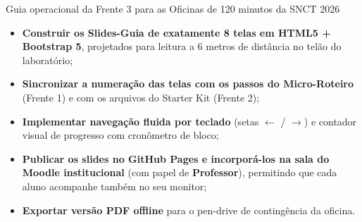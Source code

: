   {Guia operacional da Frente 3 para as Oficinas de 120 minutos da SNCT 2026}
  {\hspace{4pt}
   \hspace{4pt}
   }

\vspace{0.4em}

\begin{boxObjetivos}
\begin{itemize}
  \item \textbf{Construir os Slides-Guia de exatamente 8 telas em HTML5 + Bootstrap 5}, projetados para leitura a 6 metros de distância no telão do laboratório;
  \item \textbf{Sincronizar a numeração das telas com os passos do Micro-Roteiro} (Frente 1) e com os arquivos do Starter Kit (Frente 2);
  \item \textbf{Implementar navegação fluida por teclado} (setas $\leftarrow$ / $\rightarrow$) e contador visual de progresso com cronômetro de bloco;
  \item \textbf{Publicar os slides no GitHub Pages e incorporá-los na sala do Moodle institucional} (com papel de \textbf{Professor}), permitindo que cada aluno acompanhe também no seu monitor;
  \item \textbf{Exportar versão PDF offline} para o pen-drive de contingência da oficina.
\end{itemize}
\end{boxObjetivos}

\begin{mapaAula}
\end{mapaAula}

